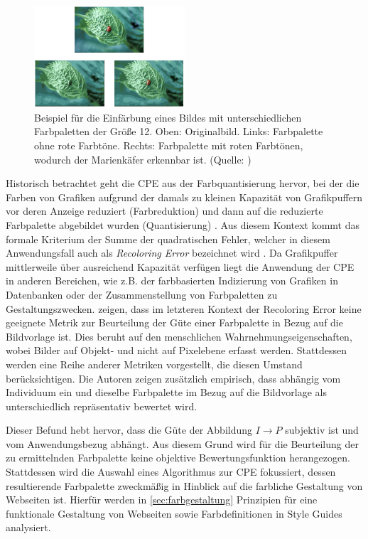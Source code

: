 \begin{figure}[h]
\centering
\includegraphics[width=0.5\textwidth]{img/ladybug.png}
\caption{Beispiel für die Einfärbung eines Bildes mit unterschiedlichen Farbpaletten der Größe 12. Oben: Originalbild. Links: Farbpalette ohne rote Farbtöne. Rechts: Farbpalette mit roten Farbtönen, wodurch der Marienkäfer erkennbar ist. (Quelle: \citep{acopa})}
\label{fig:ladybug}
\end{figure}

Historisch betrachtet geht die CPE aus der Farbquantisierung hervor, bei der die Farben von Grafiken aufgrund der damals zu kleinen Kapazität von Grafikpuffern vor deren Anzeige reduziert (Farbreduktion) und dann auf die reduzierte Farbpalette abgebildet wurden (Quantisierung) \citep{variance}. Aus diesem Kontext kommt das formale Kriterium der Summe der quadratischen Fehler, welcher in diesem Anwendungsfall auch als \emph{Recoloring Error} bezeichnet wird \citep{colorthemes}. Da Grafikpuffer mittlerweile über ausreichend Kapazität verfügen liegt die Anwendung der CPE in anderen Bereichen, wie z.B. der farbbasierten Indizierung von Grafiken in Datenbanken oder der Zusammenstellung von Farbpaletten zu Gestaltungszwecken. \citet{colorthemes} zeigen, dass im letzteren Kontext der Recoloring Error keine geeignete Metrik zur Beurteilung der Güte einer Farbpalette in Bezug auf die Bildvorlage ist. Dies beruht auf den menschlichen Wahrnehmungseigenschaften, wobei Bilder auf Objekt- und nicht auf Pixelebene erfasst werden. Stattdessen werden eine Reihe anderer Metriken vorgestellt, die diesen Umstand berücksichtigen. Die Autoren zeigen zusätzlich empirisch, dass abhängig vom Individuum ein und dieselbe Farbpalette im Bezug auf die Bildvorlage als unterschiedlich repräsentativ bewertet wird.

Dieser Befund hebt hervor, dass die Güte der Abbildung $I \to P$ subjektiv ist und vom Anwendungsbezug abhängt. Aus diesem Grund wird für die Beurteilung der zu ermittelnden Farbpalette keine objektive Bewertungsfunktion herangezogen. Stattdessen wird die Auswahl eines Algorithmus zur CPE fokussiert, dessen resultierende Farbpalette zweckmäßig in Hinblick auf die farbliche Gestaltung von Webseiten ist. Hierfür werden in \autoref{sec:farbgestaltung} Prinzipien für eine funktionale Gestaltung von Webseiten sowie Farbdefinitionen in Style Guides analysiert.

